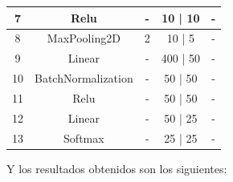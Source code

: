 \documentclass[12pt, spanish]{article}
\begin{document}
\begin{table}[H]
{\begin{tabular}{|c|c|c|c|c|}
7                       & Relu                  & -                                                                                    & 10 | 10                           & -                                                                                                 \\ \hline
8                       & MaxPooling2D          & 2                                                                                    & 10 | 5                            & -                                                                                                 \\ \hline
9                       & Linear                & -                                                                                    & 400 | 50                          & -                                                                                                 \\ \hline
10                      & BatchNormalization    & -                                                                                    & 50 | 50                           & -                                                                                                 \\ \hline
11                      & Relu                  & -                                                                                    & 50 | 50                           & -                                                                                                 \\ \hline
12                      & Linear                & -                                                                                    & 50 | 25                           & -                                                                                                 \\ \hline
13                      & Softmax               & -                                                                                    & 25 | 25                           & -                                                                                                 \\ \hline
\end{tabular}%
}
\end{table}


Y los resultados obtenidos son los siguientes:
\end{document}
